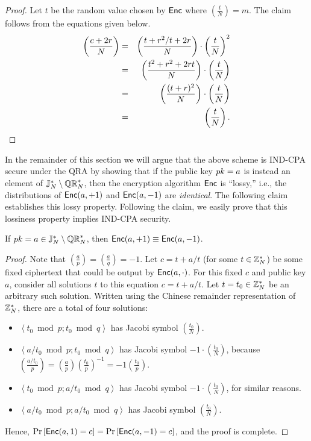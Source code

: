 \documentclass[11pt]{article}
\begin{document}
\begin{proof}
  Let $t$ be the random value chosen by $\mathsf{Enc}$ where $\left(
    \frac{t}{N} \right) = m$.  The claim follows from the equations
  given below.
  \begin{eqnarray*}
    \left( \frac{c+2r}{N} \right) &=& \left( \frac{t + r^2/t + 2r}{N}
    \right) \cdot \left( \frac{t}{N} \right)^2  \\
    &=& \left( \frac{t^2 + r^2 + 2rt}{N} \right) \cdot \left(
      \frac{t}{N} \right)  \\
    &=& \left( \frac{(t+r)^2}{N} \right) \cdot \left( \frac{t}{N}
    \right) \\
    &=& \left( \frac{t}{N} \right). \qedhere
  \end{eqnarray*}
\end{proof}

In the remainder of this section we will argue that the above scheme
is IND-CPA secure under the QRA by showing that if the public key $pk
= a$ is instead an element of $\mathbb{J}_N^{*} \setminus \mathbb{QR}_{N}^{*}$, then the
encryption algorithm $\mathsf{Enc}$ is ``lossy,'' i.e., the distributions
of $\mathsf{Enc}(a, +1)$ and $\mathsf{Enc}(a, -1)$ are \emph{identical}.  The
following claim establishes this lossy property.  Following the claim,
we easily prove that this lossiness property implies IND-CPA security.

\begin{claim}
  \label{claim:lossy}
  If $pk = a \in \mathbb{J}_N^{*} \setminus \mathbb{QR}_{N}^{*}$, then $\mathsf{Enc}(a, +1)
  \equiv \mathsf{Enc}(a, -1)$.
\end{claim}

\begin{proof}
  Note that $\left( \frac{a}{p} \right) = \left( \frac{a}{q} \right) =
  -1$.  Let $c = t+a/t$ (for some $t \in \mathbb{Z}_N^{*}$) be some fixed
  ciphertext that could be output by $\mathsf{Enc}(a, \cdot)$.  For this
  fixed $c$ and public key $a$, consider all solutions $t$ to this
  equation $c = t+a/t$.  Let $t = t_0 \in \mathbb{Z}_N^*$ be an arbitrary such
  solution.  Written using the Chinese remainder representation of
  $\mathbb{Z}_N^{*}$, there are a total of four solutions:
  \begin{itemize}
  \item $\left\langle t_0 \bmod p ; t_0 \bmod q \right\rangle$ has
    Jacobi symbol $\left( \frac{t_0}{N} \right)$.
  \item $\left\langle a/t_0 \bmod p ; t_0 \bmod q \right\rangle$ has
    Jacobi symbol $-1 \cdot \left( \frac{t_0}{N} \right)$, because
    $\left( \frac{a/t_{0}}{p} \right) = \left( \frac{a}{p} \right)
    \left( \frac{t_{0}}{p} \right)^{-1} = -1 \left( \frac{t_{0}}{p}
    \right)$.
  \item $\left\langle t_0 \bmod p ; a/t_0 \bmod q \right\rangle$ has
    Jacobi symbol $-1 \cdot \left( \frac{t_0}{N} \right)$, for similar
    reasons.
  \item $\left\langle a/t_0 \bmod p ; a/t_0 \bmod q \right\rangle$ has
    Jacobi symbol $\left( \frac{t_0}{N} \right)$.
  \end{itemize}
  Hence, $\Pr \left[ \mathsf{Enc}(a, 1) = c \right] = \Pr \left[ \mathsf{Enc}(a,
    -1) = c \right]$, and the proof is complete.
\end{proof}
\end{document}
